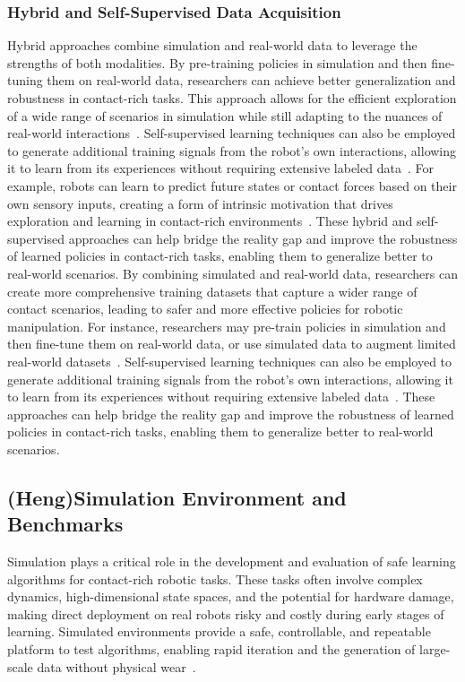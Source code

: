 \documentclass[Afour,sageh,times]{template/sagej}
\newcommand{\suggest}[1]{{\color{olive} (#1)}}
\begin{document}
\subsubsection{Hybrid and Self-Supervised Data Acquisition}
Hybrid approaches combine simulation and real-world data to leverage the strengths of both modalities. 
By pre-training policies in simulation and then fine-tuning them on real-world data, researchers can achieve better generalization and robustness in contact-rich tasks. This approach allows for the efficient exploration of a wide range of scenarios in simulation while still adapting to the nuances of real-world interactions~\cite{berrocal2024evaluating}.
Self-supervised learning techniques can also be employed to generate additional training signals from the robot's own interactions, allowing it to learn from its experiences without requiring extensive labeled data~\cite{zhang2024srl}. 
For example, robots can learn to predict future states or contact forces based on their own sensory inputs, creating a form of intrinsic motivation that drives exploration and learning in contact-rich environments~\cite{zhang2024srl}.
These hybrid and self-supervised approaches can help bridge the reality gap and improve the robustness of learned policies in contact-rich tasks, enabling them to generalize better to real-world scenarios. 
By combining simulated and real-world data, researchers can create more comprehensive training datasets that capture a wider range of contact scenarios, leading to safer and more effective policies for robotic manipulation.
For instance, researchers may pre-train policies in simulation and then fine-tune them on real-world data, or use simulated data to augment limited real-world datasets~\cite{berrocal2024evaluating}. Self-supervised learning techniques can also be employed to generate additional training signals from the robot's own interactions, allowing it to learn from its experiences without requiring extensive labeled data~\cite{zhang2024srl}.
These approaches can help bridge the reality gap and improve the robustness of learned policies in contact-rich tasks, enabling them to generalize better to real-world scenarios.  

\subsection{\suggest{Heng}Simulation Environment and Benchmarks}
Simulation plays a critical role in the development and evaluation of safe learning algorithms for contact-rich robotic tasks.
These tasks often involve complex dynamics, high-dimensional state spaces, and the potential for hardware damage, making direct deployment on real robots risky and costly during early stages of learning. 
Simulated environments provide a safe, controllable, and repeatable platform to test algorithms, enabling rapid iteration and the generation of large-scale data without physical wear~\cite{long2025survey}.
\end{document}
